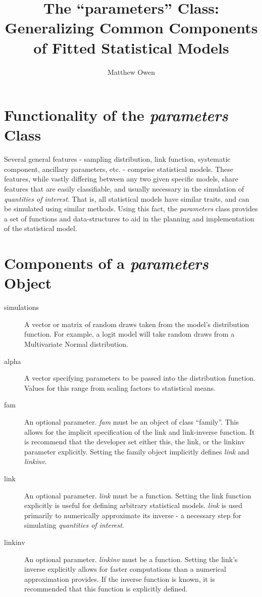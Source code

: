 \documentclass[a4paper,11pt]{article}
\begin{document}
\title{The ``parameters'' Class: Generalizing Common Components of Fitted Statistical Models}
\author{Matthew Owen}
\maketitle

\section{Functionality of the \emph{parameters} Class}

Several general features - sampling distribution, link function,
systematic component, ancillary parameters, etc. - comprise
statistical models.  These features, while vastly differing between
any two given specific models, share features that are easily
classifiable, and usually necessary in the simulation of
\emph{quantities of interest}.  That is, all statistical models have
similar traits, and can be simulated using similar methods.  Using
this fact, the \emph{parameters} class provides a set of functions
and data-structures to aid in the planning and implementation of 
the statistical model.


\section{Components of a \emph{parameters} Object}

\begin{description}
	\item[simulations] A vector or matrix of random draws taken from
		the model's distribution function.  For example, a logit model
		will take random draws from a Multivariate Normal distribution.
		
	\item[alpha] A vector specifying parameters to be passed into
		the distribution function.  Values for this range from scaling
		factors to statistical means.
	
	\item[fam] An optional parameter.  \emph{fam} must be an object
		of class ``family''.  This allows for the implicit specification
		of the link and link-inverse function.  It is recommend that the
		developer set either this, the link, or the linkinv parameter
		explicitly.  Setting the family object implicitly defines
		\emph{link} and \emph{linkinv}.
		
	\item[link] An optional parameter.  \emph{link} must be a function.
		Setting the link function explicitly is useful for defining
		arbitrary statistical models.  \emph{link} is used primarily to
		numerically approximate its inverse - a necessary step for
		simulating \emph{quantities of interest}.
		
	\item[linkinv] An optional parameter.  \emph{linkinv} must be a
		function.  Setting the link's inverse explicitly allows for faster
		computations than a numerical approximation provides.  If the
		inverse function is known, it is recommended that this function
		is explicitly defined.
		
\end{description}
\end{document}
